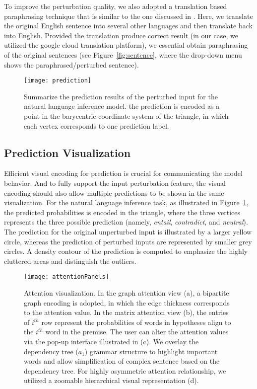 To improve the perturbation quality, we also adopted a translation based paraphrasing technique that is similar to the one discussed in \cite{mallinson2017paraphrasing}. Here, we translate the original English sentence into several other languages and then translate back into English. Provided the translation produce correct result (in our case, we utilized the google cloud translation platform), we essential obtain paraphrasing of the original sentences (see Figure~\ref{fig:sentence}, where the drop-down menu shows the paraphrased/perturbed sentence).

\begin{figure}[htbp]
\centering
\vspace{-2mm}
 \texttt{[image: prediction]}
 \caption{
Summarize the prediction results of the perturbed input for the natural language inference model.
the prediction is encoded as a point in the barycentric coordinate system of the triangle, in which each vertex corresponds to one prediction label.
}
\vspace{-3mm}
\label{fig:prediction}
\end{figure}

\subsection{Prediction Visualization}
Efficient visual encoding for prediction is crucial for communicating the model behavior. And to fully support the input perturbation feature, the visual encoding should also allow multiple predictions to be shown in the same visualization.
%
For the natural language inference task, as illustrated in Figure~\ref{fig:prediction}, the predicted probabilities is encoded in the triangle, where the three vertices represents the three possible prediction (namely, \emph{entail}, \emph{contradict}, and \emph{neutral}). The prediction for the original unperturbed input is illustrated by a larger yellow circle, whereas the prediction of perturbed inputs are represented by smaller grey circles.
A density contour of the prediction is computed to emphasize the highly cluttered areas and distinguish the outliers.

\begin{figure*}[t]
\centering
\vspace{-2mm}
 \texttt{[image: attentionPanels]}
  \vspace{-3mm}
 \caption{
Attention visualization. In the graph attention view (a), a bipartite graph encoding is adopted, in which the edge thickness corresponds to the attention value. In the matrix attention view (b), the entries of $i^{th}$ row represent the probabilities of words in hypotheses align to the $i^{th}$ word in the premise.
The user can alter the attention values via the pop-up interface illustrated in (c).
We overlay the dependency tree ($a_1$) grammar structure to highlight important words and allow simplification of complex sentence based on the dependency tree.
%
For highly asymmetric attention relationship, we utilized a zoomable hierarchical visual representation (d).
}
\vspace{-3mm}
\label{fig:attentionVis}
\end{figure*}

